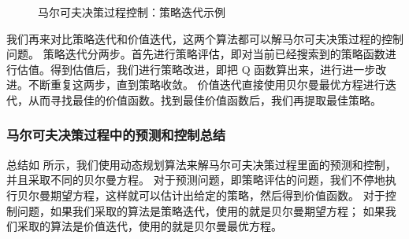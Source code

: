 \begin{figure}[h]
  \centering
  \caption{马尔可夫决策过程控制：策略迭代示例}
  \label{fig:}
\end{figure}



我们再来对比策略迭代和价值迭代，这两个算法都可以解马尔可夫决策过程的控制问题。
策略迭代分两步。首先进行策略评估，即对当前已经搜索到的策略函数进行估值。得到估值后，我们进行策略改进，即把 Q 函数算出来，进行进一步改进。不断重复这两步，直到策略收敛。
价值迭代直接使用贝尔曼最优方程进行迭代，从而寻找最佳的价值函数。找到最佳价值函数后，我们再提取最佳策略。

\subsubsection{马尔可夫决策过程中的预测和控制总结} 
总结如 所示，我们使用动态规划算法来解马尔可夫决策过程里面的预测和控制，并且采取不同的贝尔曼方程。
对于预测问题，即策略评估的问题，我们不停地执行贝尔曼期望方程，这样就可以估计出给定的策略，然后得到价值函数。
对于控制问题，如果我们采取的算法是策略迭代，使用的就是贝尔曼期望方程；
如果我们采取的算法是价值迭代，使用的就是贝尔曼最优方程。


